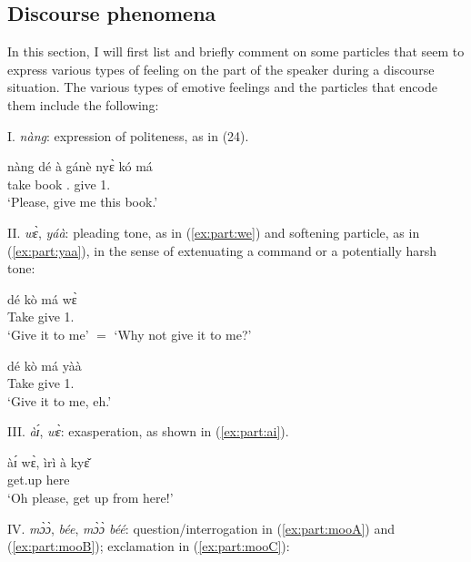 \subsection{ Discourse phenomena}
In this section, I will first list and briefly comment on some particles that seem to
express various types of feeling on the part of the speaker during a discourse situation. The
various types of emotive feelings and the particles that encode them include the following:\bigskip



\noindent I. \textit{nàng}: expression of politeness, as in (24).

\ea \label{ex:nang}\gll  nàng dé à gánè nyɛ̀ kó má\\
{\PART} take {\DEF} book {\DEM}. give 1.{\SG}\\
\glt ‘Please, give me this book.’\z


\noindent II. \textit{wɛ̀}, \textit{yáà}: pleading tone, as in (\ref{ex:part:we}) and softening particle, as in (\ref{ex:part:yaa}), in the sense of
extenuating a command or a potentially harsh tone:

\ea \label{ex:part:we}\gll  dé kò má wɛ̀\\
Take give 1.{\SG} {\PART}\\
\glt ‘Give it to me' $=$ `Why not give it to me?’\z

\ea  \label{ex:part:yaa} \gll  dé kò má yàà\\
Take give 1.{\SG} {\PART}\\
\glt ‘Give it to me, eh.’\z 


\noindent III. \textit{àɪ́}, \textit{wɛ̀}: exasperation, as shown in (\ref{ex:part:ai}).


\ea \label{ex:part:ai} \gll  àɪ́ wɛ̀, ìrì à kyɛ̌\\
{\PART} {\PART} get.up {\DEF} here\\
\glt ‘Oh please, get up from here!’\z 

\noindent IV. \textit{mɔ̀ɔ̀}, \textit{bée}, \textit{mɔ̀ɔ̀ béé}: question/interrogation in (\ref{ex:part:mooA}) and (\ref{ex:part:mooB}); exclamation in (\ref{ex:part:mooC}):


\ea {}
\z\z 

